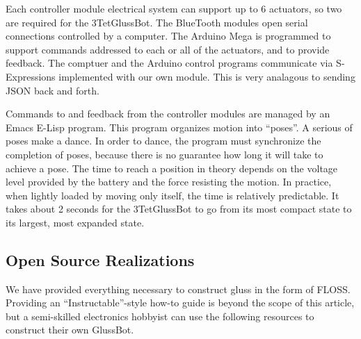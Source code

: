 \documentclass[12pt]{article}
\begin{document}
Each controller module electrical system can support up to 6 actuators, so two are required for the 3TetGlussBot.
The BlueTooth modules open serial connections controlled by a computer.
The Arduino Mega is programmed to support commands addressed to each or all of the actuators, and
to provide feedback. The comptuer and the Arduino control programs communicate via S-Expressions
implemented with our own module. This is very analagous to sending JSON back and forth.

Commands to and feedback from the controller modules are managed by an Emacs E-Lisp program.
This program organizes motion into ``poses''. A serious of poses make a dance.
In order to dance, the program must synchronize the completion of poses, because there is no
guarantee how long it will take to achieve a pose. The time to reach a position in theory
depends on the voltage level provided by the battery and the force resisting the motion.
In practice, when lightly loaded by moving only itself, the time is relatively predictable. It takes
about 2 seconds for the 3TetGlussBot to go from its most compact state to its largest, most expanded state.

\subsection{Open Source Realizations}

We have provided everything necessary to construct gluss in the form of FLOSS. Providing an ``Instructable''-style
how-to guide is beyond the scope of this article, but a semi-skilled electronics hobbyist can use the
following resources to construct their own GlussBot.
\end{document}
